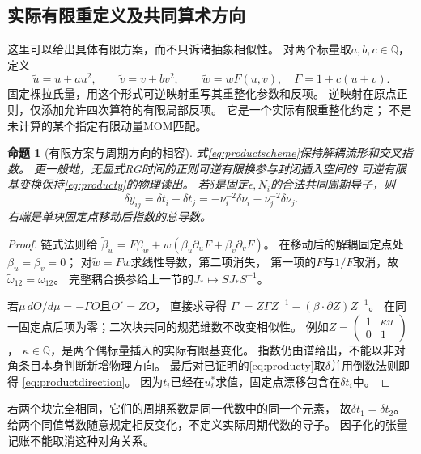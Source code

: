 \documentclass[11pt,a4paper]{ctexart}
\theoremstyle{cnplain}\newtheorem{theorem}{定理}[section]
\newtheorem{proposition}[theorem]{命题}
\theoremstyle{definition}\newtheorem{definition}[theorem]{定义}
\theoremstyle{remark}\newtheorem{remark}[theorem]{注}
\newcommand{\Q}{\mathbb Q}\newcommand{\cC}{\mathcal C}
\begin{document}
\subsection{实际有限重定义及共同算术方向}

这里可以给出具体有限方案，而不只诉诸抽象相似性。
对两个标量取$a,b,c\in\Q$，定义
\[
 \widetilde u=u+au^2,\qquad
 \widetilde v=v+bv^2,\qquad
 \widetilde w=wF(u,v),\quad F=1+c(u+v).                \tag{PC7}\label{eq:productscheme}
\]
固定裸拉氏量，用这个形式可逆映射重写其重整化参数和反项。
逆映射在原点正则，仅添加允许四次算符的有限局部反项。
它是一个实际有限重整化约定；
不是未计算的某个指定有限动量MOM匹配。

\begin{proposition}[有限方案与周期方向的相容]\label{prop:productscheme}
式\eqref{eq:productscheme}保持解耦流形和交叉指数。
更一般地，无显式RG时间的正则可逆有限换参与封闭插入空间的
可逆有限基变换保持\eqref{eq:producty}的物理读出。
若$\delta$是固定$\epsilon,N_i$的合法共同周期导子，则
\[
 \delta y_{ij}=\delta t_i+\delta t_j
       =-\nu_i^{-2}\delta\nu_i-\nu_j^{-2}\delta\nu_j .
                                                               \tag{PC8}\label{eq:productdirection}
\]
右端是单块固定点移动后指数的总导数。
\end{proposition}
\begin{proof}
链式法则给
$\widetilde\beta_w=F\beta_w+w(\beta_u\partial_uF+\beta_v\partial_vF)$。
在移动后的解耦固定点处$\beta_u=\beta_v=0$；
对$\widetilde w=Fw$求线性导数，第二项消失，
第一项的$F$与$1/F$取消，故$\widetilde\omega_{12}=\omega_{12}$。
完整耦合换参给上一节的$J_*\mapsto SJ_*S^{-1}$。

若$\mu\,dO/d\mu=-\Gamma O$且$O'=ZO$，
直接求导得
$\Gamma'=Z\Gamma Z^{-1}-(\beta\cdot\partial Z)Z^{-1}$。
在同一固定点后项为零；二次块共同的规范维数不改变相似性。
例如$Z=\left(\begin{smallmatrix}1&\kappa u\\0&1\end{smallmatrix}\right)$，
$\kappa\in\Q$，是两个偶标量插入的实际有限基变化。
指数仍由谱给出，不能以非对角条目本身判断新增物理方向。
最后对已证明的\eqref{eq:producty}取$\delta$并用倒数法则即得
\eqref{eq:productdirection}。
因为$t_i$已经在$u_i^*$求值，固定点漂移包含在$\delta t_i$中。
\end{proof}

若两个块完全相同，它们的周期系数是同一代数中的同一个元素，
故$\delta t_1=\delta t_2$。
给两个同值常数随意规定相反变化，不定义实际周期代数的导子。
因子化的张量记账不能取消这种对角关系。
\end{document}
